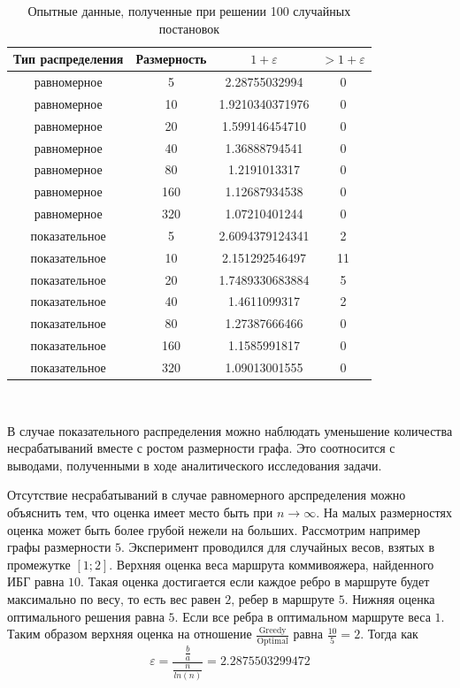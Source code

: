 \documentclass[a4paper, 14pt]{extarticle}
\numberwithin{equation}{section}
\begin{document}
\begin{table}
\caption{Опытные данные, полученные при решении 100 случайных постановок}
\begin{center}
 \begin{tabular}{||c | c | c | c||} 
 \hline
 Тип распределения & Размерность  & $1+\varepsilon$  &  $> 1 +\varepsilon$ \\ [0.5ex] 
 \hline\hline
 равномерное & 5 & 2.28755032994 & 0 \\ 
 \hline
 равномерное & 10 & 1.9210340371976 & 0 \\
 \hline
 равномерное & 20 & 1.599146454710 & 0 \\
 \hline
 равномерное & 40 & 1.36888794541 & 0 \\
 \hline
 равномерное & 80 & 1.2191013317 & 0 \\
 \hline
 равномерное & 160 & 1.12687934538 & 0 \\
 \hline
 равномерное & 320 & 1.07210401244 & 0 \\
 \hline
 показательное & 5 & 2.6094379124341 & 2 \\
 \hline
 показательное & 10 & 2.151292546497 & 11 \\
 \hline
 показательное & 20 & 1.7489330683884 & 5 \\ 
  \hline
 показательное & 40 & 1.4611099317 & 2 \\ 
  \hline
 показательное & 80 & 1.27387666466 & 0 \\ 
  \hline
 показательное & 160 & 1.1585991817 & 0 \\ 
 \hline
 показательное & 320 & 1.09013001555 & 0 \\[1ex] 
 \hline
\end{tabular}\\
\end{center}
\end{table}


В случае показательного распределения можно наблюдать уменьшение количества несрабатываний вместе с ростом размерности графа. Это соотносится с выводами, полученными в ходе аналитического исследования задачи. 

Отсутствие несрабатываний в случае равномерного арспределения можно объяснить тем, что оценка имеет место быть при $n \rightarrow \infty$. На малых размерностях оценка может быть более грубой нежели на больших. Рассмотрим например графы размерности $5$. Эксперимент проводился для случайных весов, взятых в промежутке $[1;2]$. Верхняя оценка веса маршрута коммивояжера, найденного ИБГ равна $10$. Такая оценка достигается если каждое ребро в маршруте будет максимально по весу, то есть вес равен $2$, ребер в маршруте $5$. Нижняя оценка оптимального решения равна $5$. Если все ребра в оптимальном маршруте веса $1$. Таким образом верхняя оценка на отношение $\frac{\mathrm{Greedy}}{\mathrm{Optimal}}$ равна $\frac{10}{5} = 2$. Тогда как
\begin{equation*}
\varepsilon = \frac{\frac{b}{a}}{\frac{n}{ln(n)}} = 2.2875503299472
\end{equation*}
\end{document}
